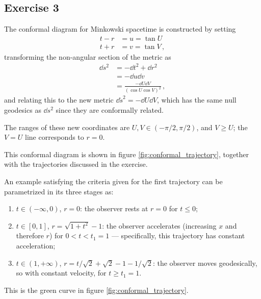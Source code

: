 \documentclass[main.tex]{subfiles}
\begin{document}
\subsection{Exercise 3}

The conformal diagram for Minkowski spacetime is constructed by setting 
%
\begin{align}
t - r &= u = \tan U  \\
t + r &= v = \tan V
\,,
\end{align}
%
transforming the non-angular section of the metric as 
%
\begin{align}
\dd{s^2} &= - \dd{t^2} + \dd{r^2}  \\
&= - \dd{u} \dd{v}  \\
&= \frac{- \dd{U} \dd{V}}{(\cos U \cos V)^2}
\,,
\end{align}
%
and relating this to the new metric \(\dd{\widetilde{s}}^2 = - \dd{U} \dd{V}\), which has the same null geodesics as \(\dd{s}^2\) since they are conformally related. 

The ranges of these new coordinates are \(U, V \in (- \pi /2, \pi /2)\), 
and \(V \geq U\); the \(V = U\) line corresponds to \(r = 0\). 

This conformal diagram is shown in figure 
\ref{fig:conformal_trajectory}, together with the trajectories discussed in the exercise. 

An example satisfying the criteria given for the first trajectory can be parametrized in its three stages as: 
\begin{enumerate}
    \item \(t \in (- \infty , 0)\), \(r = 0\): the observer rests at \(r = 0\) for \(t \leq 0\);
    \item \(t \in [0, 1]\), \(r = \sqrt{1 + t^2} - 1\): the observer accelerates (increasing \(x\) and therefore \(r\)) for \(0 < t < t_1 = 1\) --- specifically, this trajectory has constant acceleration;
    \item \(t \in (1, + \infty )\), \(r = t / \sqrt{2} + \sqrt{2} - 1 - 1 / \sqrt{2}\): the observer moves geodesically, so with constant velocity, for \(t \geq t_1 = 1\).
\end{enumerate}

This is the green curve in figure \ref{fig:conformal_trajectory}.
\end{document}

